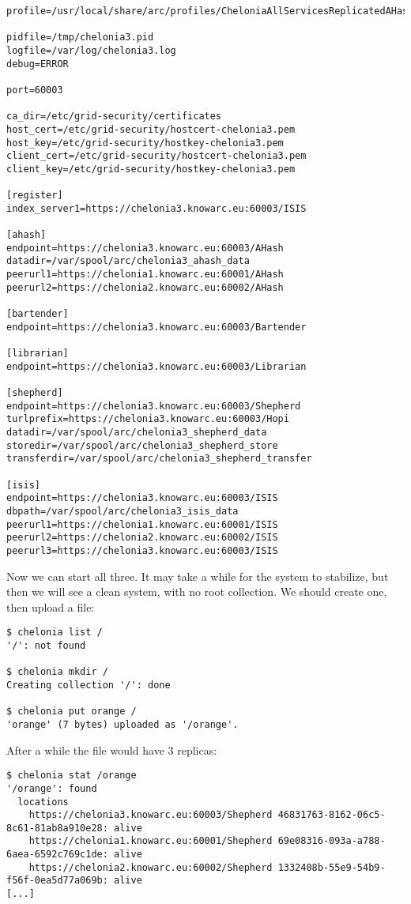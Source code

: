 \documentclass{article}
\begin{document}
\begin{verbatim}
profile=/usr/local/share/arc/profiles/CheloniaAllServicesReplicatedAHashWithISIS.xml

pidfile=/tmp/chelonia3.pid
logfile=/var/log/chelonia3.log
debug=ERROR

port=60003

ca_dir=/etc/grid-security/certificates
host_cert=/etc/grid-security/hostcert-chelonia3.pem
host_key=/etc/grid-security/hostkey-chelonia3.pem
client_cert=/etc/grid-security/hostcert-chelonia3.pem
client_key=/etc/grid-security/hostkey-chelonia3.pem

[register]
index_server1=https://chelonia3.knowarc.eu:60003/ISIS

[ahash]
endpoint=https://chelonia3.knowarc.eu:60003/AHash
datadir=/var/spool/arc/chelonia3_ahash_data
peerurl1=https://chelonia1.knowarc.eu:60001/AHash
peerurl2=https://chelonia2.knowarc.eu:60002/AHash

[bartender]
endpoint=https://chelonia3.knowarc.eu:60003/Bartender

[librarian]
endpoint=https://chelonia3.knowarc.eu:60003/Librarian

[shepherd]
endpoint=https://chelonia3.knowarc.eu:60003/Shepherd
turlprefix=https://chelonia3.knowarc.eu:60003/Hopi
datadir=/var/spool/arc/chelonia3_shepherd_data
storedir=/var/spool/arc/chelonia3_shepherd_store
transferdir=/var/spool/arc/chelonia3_shepherd_transfer

[isis]
endpoint=https://chelonia3.knowarc.eu:60003/ISIS
dbpath=/var/spool/arc/chelonia3_isis_data
peerurl1=https://chelonia1.knowarc.eu:60001/ISIS
peerurl2=https://chelonia2.knowarc.eu:60002/ISIS
peerurl3=https://chelonia3.knowarc.eu:60003/ISIS
\end{verbatim}

Now we can start all three. It may take a while for the system to stabilize, but then we will see a clean system, with no root collection. We should create one, then upload a file:

\begin{verbatim}
$ chelonia list /
'/': not found

$ chelonia mkdir /
Creating collection '/': done

$ chelonia put orange /
'orange' (7 bytes) uploaded as '/orange'.
\end{verbatim}

After a while the file would have 3 replicas:

\begin{verbatim}
$ chelonia stat /orange
'/orange': found
  locations
    https://chelonia3.knowarc.eu:60003/Shepherd 46831763-8162-06c5-8c61-81ab8a910e28: alive
    https://chelonia1.knowarc.eu:60001/Shepherd 69e08316-093a-a788-6aea-6592c769c1de: alive
    https://chelonia2.knowarc.eu:60002/Shepherd 1332408b-55e9-54b9-f56f-0ea5d77a069b: alive
[...]
\end{verbatim}
\end{document}
